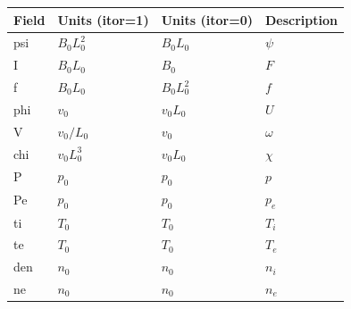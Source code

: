 \begin{tabular}{llll}
\textbf{Field} & \textbf{Units (itor=1)} & \textbf{Units (itor=0)} & \textbf{Description}\\
\hline
psi  & $B_0 L_0^2$ & $B_0 L_0$   & $\psi$\\
I    & $B_0 L_0$   & $B_0$       & $F$ \\
f    & $B_0 L_0$   & $B_0 L_0^2$ & $f$ \\
phi  & $v_0$       & $v_0 L_0$   & $U$ \\
V    & $v_0/L_0$   & $v_0$       & $\omega$ \\
chi  & $v_0 L_0^3$ & $v_0 L_0$   & $\chi$ \\
P    & $p_0$       & $p_0$       & $p$ \\
Pe   & $p_0$       & $p_0$       & $p_e$ \\
ti   & $T_0$       & $T_0$       & $T_i$ \\
te   & $T_0$       & $T_0$       & $T_e$ \\
den  & $n_0$       & $n_0$       & $n_i$ \\
ne   & $n_0$       & $n_0$       & $n_e$
\end{tabular}

